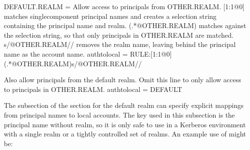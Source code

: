 \documentclass[letterpaper,10pt,english]{sphinxmanual}
\begin{document}
%
\begin{sphinxVerbatim}[commandchars=\\\{\}]
[realms]
    DEFAULT.REALM = \PYGZob{}
        \PYGZsh{} Allow access to principals from OTHER.REALM.
        \PYGZsh{}
        \PYGZsh{} [1:\PYGZdl{}1@\PYGZdl{}0] matches single\PYGZhy{}component principal names and creates
        \PYGZsh{} a selection string containing the principal name and realm.
        \PYGZsh{}
        \PYGZsh{} (.*@OTHER\PYGZbs{}.REALM) matches against the selection string, so that
        \PYGZsh{} only principals in OTHER.REALM are matched.
        \PYGZsh{}
        \PYGZsh{} s/@OTHER\PYGZbs{}.REALM\PYGZdl{}// removes the realm name, leaving behind the
        \PYGZsh{} principal name as the account name.
        auth\PYGZus{}to\PYGZus{}local = RULE:[1:\PYGZdl{}1@\PYGZdl{}0](.*@OTHER\PYGZbs{}.REALM)s/@OTHER\PYGZbs{}.REALM\PYGZdl{}//

        \PYGZsh{} Also allow principals from the default realm.  Omit this line
        \PYGZsh{} to only allow access to principals in OTHER.REALM.
        auth\PYGZus{}to\PYGZus{}local = DEFAULT
    \PYGZcb{}
\end{sphinxVerbatim}

The  subsection of the {\hyperref[\detokenize{admin/conf_files/krb5_conf:realms}]{}} section
for the default realm can specify explicit mappings from principal
names to local accounts.  The key used in this subsection is the
principal name without realm, so it is only safe to use in a Kerberos
environment with a single realm or a tightly controlled set of realms.
An example use of  might be:

%
\begin{sphinxVerbatim}[commandchars=\\\{\}]
\PYG{p}{[}\PYG{p}{]}
      
          
              
              
\end{sphinxVerbatim}
\end{document}

